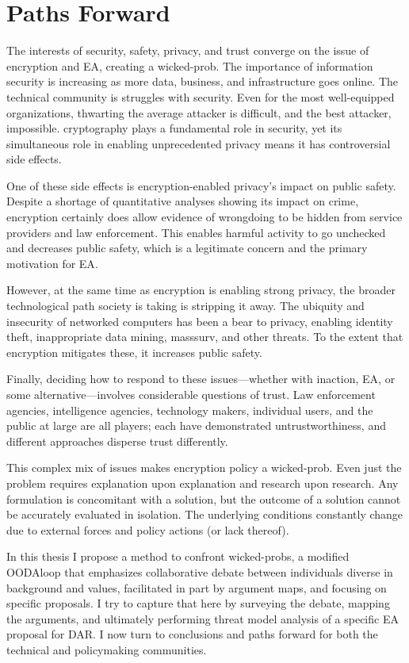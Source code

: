 \chapter{Paths Forward}
\label{chap-pathsforward}

The interests of security, safety, privacy, and trust converge on the issue of encryption and \acl{EA}, creating a
\ac{wicked-prob}. The importance of information security is increasing as more data, business, and infrastructure goes
online. The technical community is struggles with security. Even for the most well-equipped organizations, thwarting the
average attacker is difficult, and the best attacker, impossible. \Ac{cryptography} plays a fundamental role in
security, yet its simultaneous role in enabling unprecedented privacy means it has controversial side effects.

One of these side effects is encryption-enabled privacy's impact on public safety. Despite a shortage of quantitative
analyses showing its impact on crime, encryption certainly does allow evidence of wrongdoing to be hidden from service
providers and law enforcement. This enables harmful activity to go unchecked and decreases public safety, which is a
legitimate concern and the primary motivation for \ac{EA}.

However, at the same time as encryption is enabling strong privacy, the broader technological path society is taking is
stripping it away. The ubiquity and insecurity of networked computers has been a bear to privacy, enabling identity
theft, inappropriate data mining, \ac{masssurv}, and other threats. To the extent that encryption mitigates these, it
increases public safety.

Finally, deciding how to respond to these issues---whether with inaction, \ac{EA}, or some alternative---involves
considerable questions of trust. Law enforcement agencies, intelligence agencies, technology makers, individual users,
and the public at large are all players; each have demonstrated untrustworthiness, and different approaches disperse
trust differently.

This complex mix of issues makes encryption policy a \ac{wicked-prob}. Even just the problem requires explanation upon
explanation and research upon research. Any formulation is concomitant with a solution, but the outcome of a solution
cannot be accurately evaluated in isolation. The underlying conditions constantly change due to external forces and
policy actions (or lack thereof).

In this thesis I propose a method to confront \acp{wicked-prob}, a modified \ac{OODAloop} that emphasizes collaborative
debate between individuals diverse in background and values, facilitated in part by argument maps, and focusing on
specific proposals. I try to capture that here by surveying the debate, mapping the arguments, and ultimately performing
threat model analysis of a specific \ac{EA} proposal for \acl{DAR}. I now turn to conclusions and paths forward for both
the technical and policymaking communities.


